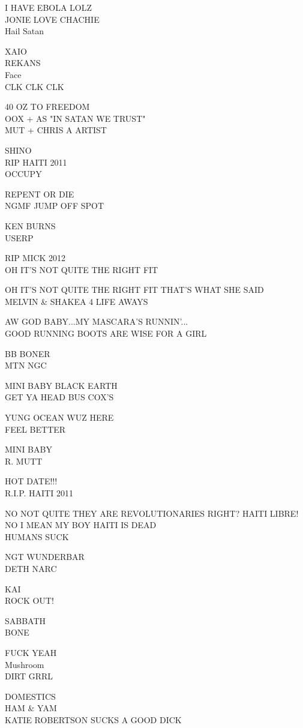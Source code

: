 \documentclass[10pt,letterpaper]{article}
\begin{document}
I HAVE EBOLA LOLZ\\
JONIE LOVE CHACHIE\\
Hail Satan

XAIO\\
REKANS\\
Face\\
CLK CLK CLK

40 OZ TO FREEDOM\\
OOX + AS "IN SATAN WE TRUST"\\
MUT + CHRIS A ARTIST

SHINO\\
RIP HAITI 2011\\
OCCUPY

REPENT OR DIE\\
NGMF JUMP OFF SPOT

KEN BURNS\\
USERP

RIP MICK 2012\\
OH IT'S NOT QUITE THE RIGHT FIT

OH IT'S NOT QUITE THE RIGHT FIT THAT'S WHAT SHE SAID\\
MELVIN \& SHAKEA 4 LIFE AWAYS

AW GOD BABY...MY MASCARA'S RUNNIN'...\\
GOOD RUNNING BOOTS ARE WISE FOR A GIRL

BB BONER\\
MTN NGC

MINI BABY BLACK EARTH\\
GET YA HEAD BUS COX'S

YUNG OCEAN WUZ HERE\\
FEEL BETTER

MINI BABY\\
R. MUTT

HOT DATE!!!\\
R.I.P. HAITI 2011

NO NOT QUITE THEY ARE REVOLUTIONARIES RIGHT?  HAITI LIBRE!  NO I MEAN MY BOY HAITI IS DEAD\\
HUMANS SUCK

NGT WUNDERBAR\\
DETH NARC

KAI\\
ROCK OUT!

SABBATH\\
BONE

FUCK YEAH\\
Mushroom\\
DIRT GRRL

DOMESTICS\\
HAM \& YAM\\
KATIE ROBERTSON SUCKS A GOOD DICK
\end{document}
